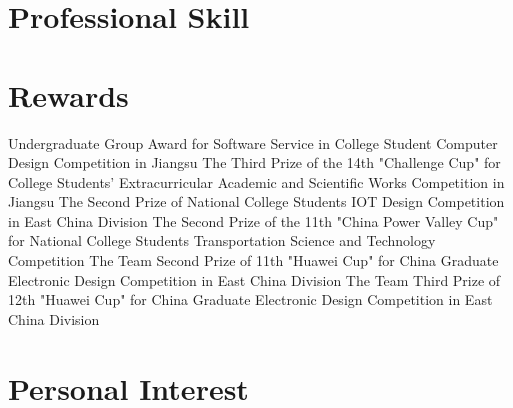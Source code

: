 \documentclass[11pt, a4paper]{moderncv}
\begin{document}
	\section{Professional Skill}

	\section{Rewards}
	{Undergraduate Group Award for Software Service in College Student Computer Design Competition in Jiangsu}{}{}{}{}
	{The Third Prize of the 14th "Challenge Cup" for College Students' Extracurricular Academic and Scientific Works Competition in Jiangsu}{}{}{}{}
	{The Second Prize of National College Students IOT Design Competition in East China Division}{}{}{}{}
	{The Second Prize of the 11th "China Power Valley Cup" for National College Students Transportation Science and Technology Competition}{}{}{}{}
	{The Team Second Prize of 11th "Huawei Cup" for China Graduate Electronic Design Competition in East China Division}{}{}{}{}
	{The Team Third Prize of 12th "Huawei Cup" for China Graduate Electronic Design Competition in East China Division}{}{}{}{}

	\section{Personal Interest}
\end{document}

